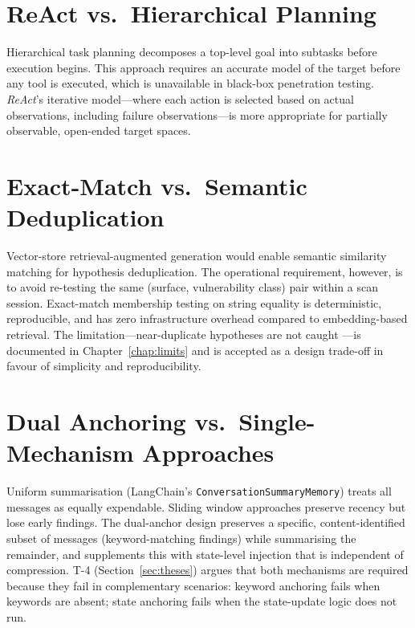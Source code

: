 \documentclass[12pt, a4paper, oneside, openany]{book}
\newcommand{\code}[1]{\texttt{#1}}
\begin{document}
\section{ReAct vs.\ Hierarchical Planning}

Hierarchical task planning \citep{deng2024pentestgpt} decomposes a
top-level goal into subtasks before execution begins.  This approach
requires an accurate model of the target before any tool is executed,
which is unavailable in black-box penetration testing.
\textit{ReAct}'s iterative model---where each action is selected
based on actual observations, including failure observations---is
more appropriate for partially observable, open-ended target spaces.

\section{Exact-Match vs.\ Semantic Deduplication}

Vector-store retrieval-augmented generation would enable semantic
similarity matching for hypothesis deduplication.  The operational
requirement, however, is to avoid re-testing the same (surface,
vulnerability class) pair within a scan session.  Exact-match
membership testing on string equality is deterministic, reproducible,
and has zero infrastructure overhead compared to embedding-based
retrieval.  The limitation---near-duplicate hypotheses are not caught
---is documented in Chapter~\ref{chap:limits} and is accepted as a
design trade-off in favour of simplicity and reproducibility.

\section{Dual Anchoring vs.\ Single-Mechanism Approaches}

Uniform summarisation (LangChain's \code{ConversationSummaryMemory})
treats all messages as equally expendable.  Sliding window approaches
preserve recency but lose early findings.  The dual-anchor design
preserves a specific, content-identified subset of messages (keyword-matching
findings) while summarising the remainder, and supplements this with
state-level injection that is independent of compression.  T-4
(Section~\ref{sec:theses}) argues that both mechanisms are required
because they fail in complementary scenarios: keyword anchoring fails
when keywords are absent; state anchoring fails when the state-update
logic does not run.

\end{document}
